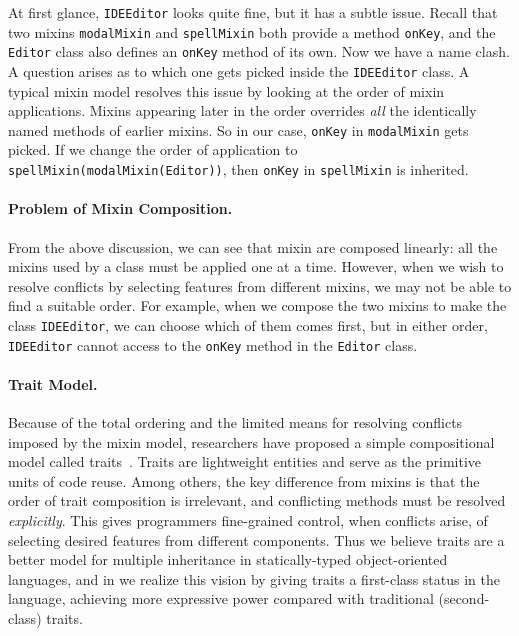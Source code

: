 At first glance, \lstinline{IDEEditor} looks quite fine, but it has a subtle
issue. Recall that two mixins \lstinline{modalMixin} and \lstinline{spellMixin}
both provide a method \lstinline{onKey}, and the \lstinline{Editor} class also
defines an \lstinline{onKey} method of its own. Now we have a name clash. A
question arises as to which one gets picked inside the \lstinline{IDEEditor}
class. A typical mixin model resolves this issue by looking at the order of mixin applications. Mixins appearing later in the order
overrides \emph{all} the identically named methods of earlier mixins. So in our
case, \lstinline{onKey} in \lstinline{modalMixin} gets picked. If we
change the order of application to \lstinline{spellMixin(modalMixin(Editor))},
then \lstinline{onKey} in \lstinline{spellMixin} is inherited.

\paragraph{Problem of Mixin Composition.}
From the above discussion, we can see that mixin are composed linearly: all the
mixins used by a class must be applied one at a time. However, when we wish to
resolve conflicts by selecting features from different mixins, we may not be
able to find a suitable order. For example, when we compose the two mixins to
make the class \lstinline{IDEEditor}, we can choose which of them comes first,
but in either order, \lstinline{IDEEditor} cannot access to the \lstinline{onKey}
method in the \lstinline{Editor} class.

\paragraph{Trait Model.}
Because of the total ordering and the limited means for resolving conflicts imposed by the mixin model,
researchers have proposed a simple compositional model called
traits~\citep{scharli2003traits, Ducasse_2006}. Traits are lightweight entities and serve as
the primitive units of code reuse. Among others, the key difference from
mixins is that the order of trait composition is irrelevant, and conflicting
methods must be resolved \emph{explicitly}. This gives programmers
fine-grained control, when conflicts arise, of selecting desired features from
different components. Thus we believe traits are a better model for multiple
inheritance in statically-typed object-oriented languages, and in \sedel we realize this
vision by giving traits a first-class status in the language,
achieving more expressive power compared with traditional (second-class) traits.


